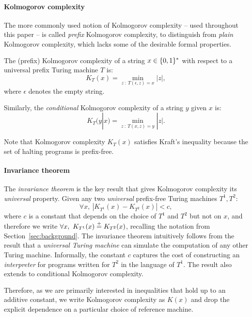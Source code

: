 \paragraph{Kolmogorov complexity} 

The more commonly used notion of Kolmogorov complexity -- used throughout this paper -- is called \emph{prefix} Kolmogorov complexity, to distinguish from \emph{plain} Kolmogorov complexity, which lacks some of the desirable formal properties.

The (prefix) Kolmogorov complexity of a string $x \in \{0,1\}^*$ with respect to a universal prefix Turing machine $T$ is:
\begin{equation}
K_T(x) = \min_{z  ~:~ T(\epsilon,z) = x} |z|,
\end{equation}
where $\epsilon$ denotes the empty string.

Similarly, the \emph{conditional} Kolmogorov complexity of a string $y$ given $x$ is:
\begin{equation}
K_T(y|x) = \min_{z  ~:~ T(x,z) = y} |z|.
\end{equation}

Note that Kolmogorov complexity $K_T(x)$ satisfies Kraft's inequality because the set of halting programs is prefix-free.

\paragraph{Invariance theorem} 
The \emph{invariance theorem} is the key result that gives Kolmogorov complexity its \emph{universal} property. Given any two \emph{universal} prefix-free Turing machines $T^1, T^2$:
\begin{equation}
    \forall x,~| K_{T^1}(x) - K_{T^2}(x) | < c,
\end{equation}
where $c$ is a constant that depends on the choice of $T^1$ and $T^2$ but not on $x$, and therefore we write $\forall x,~K_{T^1}(x) \stackrel{+}{=} K_{T^2}(x)$, recalling the notation from Section~\ref{sec:background}. The invariance theorem intuitively follows from the result that a \emph{universal Turing machine} can simulate the computation of any other Turing machine. Informally, the constant $c$ captures the cost of constructing an \emph{interpreter} for programs written for $T^2$ in the language of $T^1$. The result also extends to conditional Kolmogorov complexity.

Therefore, as we are primarily interested in inequalities that hold up to an additive constant, we write Kolmogorov complexity as $K(x)$ and drop the explicit dependence on a particular choice of reference machine.

